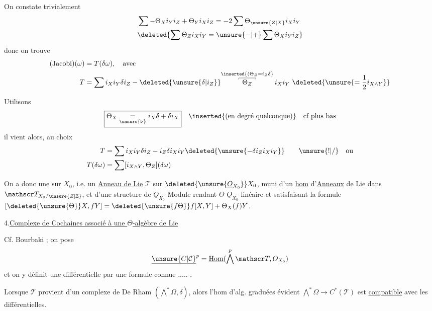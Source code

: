 On constate trivialement
\[
\begin{aligned}
&\sum-\Theta_X i_Y i_Z+\Theta_Y i_X i_Z=-2\sum\Theta_{\unsure{Z|X}}i_X i_Y\\
&\deleted{\sum\Theta_Z i_X i_Y=\unsure{-|+}\sum\Theta_X i_Y i_Z}
\end{aligned}
\]
donc on trouve
\[
\begin{aligned}
(\text{Jacobi})(\omega)&=T(\delta\omega),\quad\text{avec}\\
T&=\sum i_X i_Y\delta i_Z-\deleted{\unsure{\delta|i_Z}}\overset{\inserted{(\Theta_Z=i_Z\delta}}{\overset{\smash{\rule[-2pt]{.35pt}{2pt}\rule{2.4em}{.35pt}\rule[-2pt]{.35pt}{2pt}}}{\Theta_Z}}\,i_X i_Y\ \deleted{\unsure{=\frac{1}{2}i_{X\wedge Y}}}
\end{aligned}
\]

Utilisons
\[
\boxed{\Theta_X\underset{\unsure{\triangleright}}{=}i_X\delta+\delta i_X}\quad\inserted{\text{(en degré quelconque)}}\quad\text{cf plus bas}
\]
il vient alors, au choix
\[
\begin{aligned}
T&=\sum i_X i_Y\delta i_Z-i_Z\delta i_X i_Y\deleted{\unsure{-\delta i_Z i_X i_Y}}\qquad \unsure{!|/}\quad\text{ou}\\
T(\delta\omega)&=\sum[i_{X\wedge Y},\Theta_Z](\delta\omega)
\end{aligned}
\]

On a donc une  sur $X_0$, i.e. un \uline{Anneau de Lie}  $\mathscr T$ sur $\deleted{\unsure{\underline O_{X_0}}}X_0$, muni d'un \uline{hom}  d'\uline{Anneaux} de Lie dans $\mathscr T_{X_0/\unsure{Z|\mathbb Z}}$, et d'une structure de $\underline O_{X_0}$-Module rendant $\Theta$ $\underline O_{X_0}$-linéaire et satisfaisant la formule $[\deleted{\unsure{\Theta}}X,fY]=\deleted{\unsure{f\Theta}}f[X,Y]+\Theta_X(f)Y$.

4.\quad \uline{Complexe de Cochaines associé à une $\Theta$-algèbre de Lie} 

Cf.  Bourbaki ; on pose 
\[
\underline{\unsure{C|\mathcal C}}^p=\underline{\mathrm{Hom}}(\bigwedge^p\mathscr T,O_{X_0})
\]
et on y définit une différentielle par une formule connue ..... .

Lorsque $\mathscr T$ provient d'un complexe de De Rham $(\bigwedge^*\Omega,\delta)$, alors l'hom d'alg. graduées évident $\bigwedge^*\Omega\longrightarrow C^*(\mathscr T)$ est \uline{compatible} avec les  différentielles.

